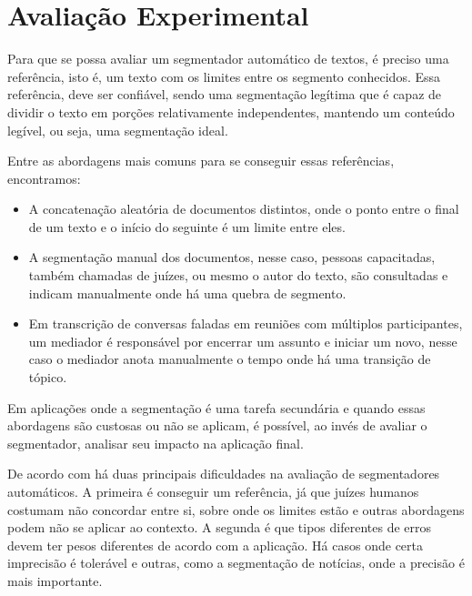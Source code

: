 
\section{Avaliação Experimental}
	\label{sec:avaliacao-experimental}

Para que se possa avaliar um segmentador automático de textos, é preciso uma referência, isto é, um texto com os limites entre os segmento conhecidos. Essa referência, deve ser confiável, sendo uma segmentação legítima que é capaz de dividir o texto em porções relativamente independentes, mantendo um conteúdo legível, ou seja, uma segmentação ideal.



Entre as abordagens mais comuns para se conseguir essas referências, encontramos: 

\begin{itemize}

\item A concatenação aleatória de documentos distintos, onde o ponto entre o final de um texto e o início do seguinte é um limite entre eles. 

\item A segmentação manual dos documentos, nesse caso, pessoas capacitadas, também chamadas de juízes, ou mesmo o autor do texto, são consultadas e indicam manualmente onde há uma quebra de segmento. 
\item Em transcrição de conversas faladas em reuniões com múltiplos participantes, um mediador é responsável por encerrar um assunto e iniciar um novo, nesse caso o mediador anota manualmente o tempo onde há uma transição de tópico. 

\end{itemize}

Em aplicações onde a segmentação é uma tarefa secundária e quando essas abordagens são custosas ou não se aplicam, é possível, ao invés de avaliar o segmentador, analisar seu impacto na aplicação final.

De acordo com \cite{Pevzner2002} há duas principais dificuldades na avaliação de segmentadores automáticos. A primeira é conseguir um referência, já que juízes humanos costumam não concordar entre si, sobre onde os limites estão e outras abordagens podem não se aplicar ao contexto. A segunda é que tipos diferentes de erros devem ter pesos diferentes de acordo com a aplicação. Há casos onde certa imprecisão é tolerável e outras, como a segmentação de notícias, onde a precisão é mais importante.


